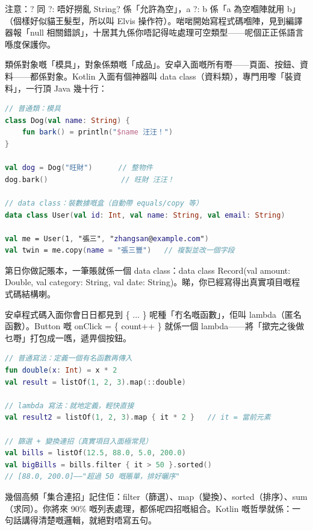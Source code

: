 \begin{tcbwarn}{注意：? 同 ?: 唔好撈亂}
String? 係「允許為空」，a ?: b 係「a 為空嗰陣就用 b」（個樣好似貓王髮型，所以叫 Elvis 操作符）。啱啱開始寫程式碼嗰陣，見到編譯器報「null 相關錯誤」，十居其九係你唔記得咗處理可空類型——呢個正正係語言喺度保護你。

\end{tcbwarn}


類係對象嘅「模具」，對象係類嘅「成品」。安卓入面嘅所有嘢——頁面、按鈕、資料——都係對象。Kotlin 入面有個神器叫 data class（資料類），專門用嚟「裝資料」，一行頂 Java 幾十行：

\begin{lstlisting}[language=Kotlin]
// 普通類：模具
class Dog(val name: String) {
    fun bark() = println("$name 汪汪！")
}

val dog = Dog("旺財")      // 整物件
dog.bark()                 // 旺財 汪汪！

// data class：裝數據嘅盒（自動帶 equals/copy 等）
data class User(val id: Int, val name: String, val email: String)

val me = User(1, "張三", "zhangsan@example.com")
val twin = me.copy(name = "張三豐")   // 複製並改一個字段
\end{lstlisting}

第日你做記賬本，一筆賬就係一個 data class：data class Record(val amount: Double, val category: String, val date: String)。睇，你已經寫得出真實項目嘅程式碼結構喇。


安卓程式碼入面你會日日都見到 \{ ... \} 呢種「冇名嘅函數」，佢叫 lambda（匿名函數）。Button 嘅 onClick = \{ count++ \} 就係一個 lambda——將「撳完之後做乜嘢」打包成一嚿，遞畀個按鈕。

\begin{lstlisting}[language=Kotlin]
// 普通寫法：定義一個有名函數再傳入
fun double(x: Int) = x * 2
val result = listOf(1, 2, 3).map(::double)

// lambda 寫法：就地定義，輕快直接
val result2 = listOf(1, 2, 3).map { it * 2 }   // it = 當前元素

// 篩選 + 變換連招（真實項目入面極常見）
val bills = listOf(12.5, 88.0, 5.0, 200.0)
val bigBills = bills.filter { it > 50 }.sorted()
// [88.0, 200.0]——"超過 50 嘅賬單，排好曬序"
\end{lstlisting}

幾個高頻「集合連招」記住佢：filter（篩選）、map（變換）、sorted（排序）、sum（求同）。你將來 90\% 嘅列表處理，都係呢四招嘅組合。Kotlin 嘅哲學就係：一句話講得清楚嘅邏輯，就絕對唔寫五句。

